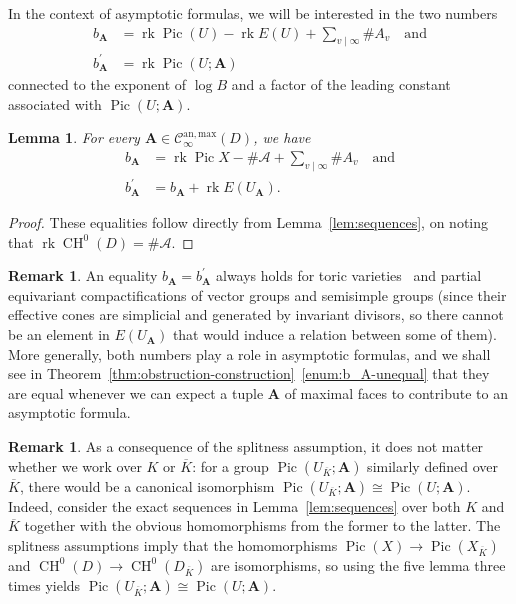 \documentclass[a4paper, twoside, 10pt]{amsart}
\newcommand{\uA}{{\boldsymbol{A}}}
\newcommand{\cA}{\mathcal{A}}
\newcommand{\cC}{\mathcal{C}}
\newcommand{\Kbar}{{\overline{K}}}
\newcommand{\Canmax}{\cC^{\mathrm{an,max}}}
\DeclareMathOperator{\CH}{CH}
\DeclareMathOperator{\Pic}{Pic}
\DeclareMathOperator{\rk}{rk}
\newtheorem{lemma}[theorem]{Lemma}
\theoremstyle{definition}
\newtheorem{remark}[theorem]{Remark}
\begin{document}
In the context of asymptotic formulas, we will be interested in the two numbers
\begin{align*}
  b_\uA  &= \rk\Pic(U)-\rk E(U) + \sum_{v\mid\infty}\# A_v \quad \text{and}\\
  b_\uA^\prime &= \rk\Pic(U;\uA)
\end{align*}
connected to the exponent of $\log B$ and a factor of the leading constant associated with $\Pic(U;\uA)$.

\begin{lemma}\label{lem:descriptions-b_A}
  For every $\uA\in\Canmax_\infty(D)$, we have
  \begin{align*}
    b_\uA        &= \rk\Pic X - \# \cA + \sum_{v\mid\infty}\# A_v \quad \text{and}\\
    b_\uA^\prime &= b_\uA + \rk E(U_\uA).
  \end{align*}
\end{lemma}
\begin{proof}
  These equalities follow directly from Lemma~\ref{lem:sequences}, on noting that 
  $\rk\CH^0(D)=\# \cA$.
\end{proof}

\begin{remark}
  An equality $b_\uA=b_\uA^\prime$ always holds for toric varieties~\cite[\S\,3.7.1 with the remark before Lem.~3.8.5]{arXiv:1006.3345} and partial equivariant compactifications of vector groups and semisimple groups (since their effective cones are simplicial and generated by invariant divisors, so there cannot be an element in $E(U_\uA)$ that would induce a relation between some of them). More generally, both numbers play a role in asymptotic formulas, and we shall see in Theorem~\ref{thm:obstruction-construction}~\eqref{enum:b_A-unequal} that they are equal whenever we can expect a tuple $\uA$ of maximal faces to contribute to an asymptotic formula.
\end{remark}

\begin{remark}
  As a consequence of the splitness assumption, it does not matter whether we work over $K$ or $\Kbar$: for a group $\Pic(U_\Kbar;\uA)$ similarly defined over $\Kbar$, there would be a canonical isomorphism $\Pic(U_\Kbar;\uA)\cong\Pic(U;\uA)$. Indeed, consider the exact sequences in Lemma~\ref{lem:sequences} over both $K$ and $\Kbar$ together with the obvious homomorphisms from the former to the latter.
  The splitness assumptions imply that the homomorphisms $\Pic(X)\to\Pic(X_\Kbar)$ and $\CH^0(D)\to \CH^0(D_\Kbar)$ are isomorphisms, so using the five lemma three times yields $\Pic(U_\Kbar;\uA)\cong\Pic(U;\uA)$.
\end{remark}
\end{document}
